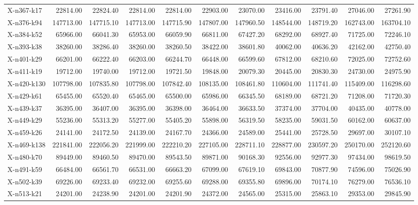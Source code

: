 \documentclass[letterpaper]{article} %
\begin{document}
\begin{landscape}
\begin{longtable}{@{}l rr rr rr rr rr@{}}
X-n367-k17 & 22814.00 & 22824.40 & 22814.00 & 22814.00 & 22903.00 & 23070.00 & 23416.00 & 23791.40 & 27046.00 & 27261.90 \\
X-n376-k94 & 147713.00 & 147715.10 & 147713.00 & 147715.90 & 147807.00 & 147960.50 & 148544.00 & 148719.20 & 162743.00 & 163704.10 \\
X-n384-k52 & 65966.00 & 66041.30 & 65953.00 & 66059.90 & 66811.00 & 67427.20 & 68292.00 & 68927.40 & 71725.00 & 72246.10 \\
X-n393-k38 & 38260.00 & 38286.40 & 38260.00 & 38260.50 & 38422.00 & 38601.80 & 40062.00 & 40636.20 & 42162.00 & 42750.40 \\
X-n401-k29 & 66201.00 & 66222.40 & 66203.00 & 66244.70 & 66448.00 & 66599.60 & 67812.00 & 68210.60 & 72025.00 & 72752.60 \\
X-n411-k19 & 19712.00 & 19740.00 & 19712.00 & 19721.50 & 19848.00 & 20079.30 & 20445.00 & 20830.30 & 24730.00 & 24975.90 \\
X-n420-k130 & 107798.00 & 107835.80 & 107798.00 & 107842.40 & 108135.00 & 108461.80 & 110604.00 & 111741.40 & 115409.00 & 116298.60 \\
X-n429-k61 & 65455.00 & 65520.40 & 65465.00 & 65500.00 & 65986.00 & 66345.50 & 68189.00 & 68721.20 & 71208.00 & 71720.30 \\
X-n439-k37 & 36395.00 & 36407.00 & 36395.00 & 36398.00 & 36464.00 & 36633.50 & 37374.00 & 37704.00 & 40435.00 & 40778.00 \\
X-n449-k29 & 55236.00 & 55313.20 & 55277.00 & 55405.20 & 55898.00 & 56319.50 & 58235.00 & 59031.50 & 60162.00 & 60637.00 \\
X-n459-k26 & 24141.00 & 24172.50 & 24139.00 & 24167.70 & 24366.00 & 24589.00 & 25441.00 & 25728.50 & 29697.00 & 30107.10 \\
X-n469-k138 & 221841.00 & 222056.20 & 221999.00 & 222210.20 & 227105.00 & 228711.10 & 228877.00 & 230597.20 & 250170.00 & 252120.60 \\
X-n480-k70 & 89449.00 & 89460.50 & 89470.00 & 89543.50 & 89871.00 & 90168.30 & 92556.00 & 92977.30 & 97434.00 & 98619.50 \\
X-n491-k59 & 66484.00 & 66561.70 & 66531.00 & 66663.20 & 67099.00 & 67619.10 & 69843.00 & 70877.90 & 74596.00 & 75026.90 \\
X-n502-k39 & 69226.00 & 69233.40 & 69232.00 & 69255.60 & 69288.00 & 69355.80 & 69896.00 & 70174.10 & 76279.00 & 76536.10 \\
X-n513-k21 & 24201.00 & 24238.90 & 24201.00 & 24201.90 & 24372.00 & 24565.00 & 25315.00 & 25863.10 & 29353.00 & 29845.90 \\

\end{longtable}
\end{landscape}
\end{document}
